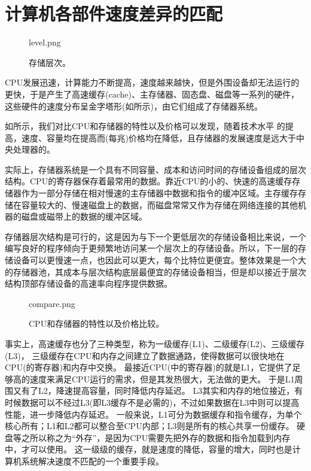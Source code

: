 \documentclass[final]{cvpr}
\begin{document}
\section{计算机各部件速度差异的匹配}\label{sec:Difference}

\begin{figure}
  	\begin{overpic}[width=\columnwidth]{level.png}\end{overpic}
    \caption{存储层次。}\label{fig:level}
\end{figure}


CPU发展迅速，计算能力不断提高，速度越来越快，但是外围设备却无法运行的更快，于是产生了高速缓存(cache)、主存储器、固态盘、磁盘等一系列的硬件，这些硬件的速度分布呈金字塔形(如所示)，由它们组成了存储器系统。

如所示，我们对比CPU和存储器的特性以及价格可以发现，随着技术水平 的提高，速度、容量均在提高而(每兆)价格均在降低，且存储器的发展速度是远大于中央处理器的。

实际上，存储器系统是一个具有不同容量、成本和访问时间的存储设备组成的层次结构。CPU的寄存器保存着最常用的数据。靠近CPU的小的、快速的高速缓存存储器作为一部分存储在相对慢速的主存储器中数据和指令的缓冲区域。主存缓存存储在容量较大的、慢速磁盘上的数据，而磁盘常常又作为存储在网络连接的其他机器的磁盘或磁带上的数据的缓冲区域。\cite{CSAPP}

存储器层次结构是可行的，这是因为与下一个更低层次的存储设备相比来说，一个编写良好的程序倾向于更频繁地访问某一个层次上的存储设备。所以，下一层的存储设备可以更慢速一点，也因此可以更大，每个比特位更便宜。整体效果是一个大的存储器池，其成本与层次结构底层最便宜的存储设备相当，但是却以接近于层次结构顶部存储设备的高速率向程序提供数据。\cite{CSAPP}


\begin{figure}
  	\begin{overpic}[width=\columnwidth]{compare.png}\end{overpic}
    \caption{CPU和存储器的特性以及价格比较。}\label{fig:cmp}
\end{figure}

事实上，高速缓存也分了三种类型，称为一级缓存(L1)、二级缓存(L2)、三级缓存(L3)，
三级缓存在CPU和内存之间建立了数据通路，使得数据可以很快地在CPU(的寄存器)和内存中交换。
最接近CPU(中的寄存器)的就是L1，它提供了足够高的速度来满足CPU运行的需求，但是其发热很大，无法做的更大。
于是L1周围又有了L2，降速提高容量，同时降低内存延迟。
L3其实和内存的地位接近，有时候数据可以不经过L3(即L3缓存不是必需的)，不过如果数据在L3中则可以提高性能，进一步降低内存延迟。
一般来说，L1可分为数据缓存和指令缓存，为单个核心所有；L1和L2都可以整合至CPU内部；L3则是所有的核心共享一份缓存。
硬盘等之所以称之为“外存”，是因为CPU需要先把外存的数据和指令加载到内存中，才可以使用。
这一级级的缓存，就是速度的降低，容量的增大，同时也是计算机系统解决速度不匹配的一个重要手段。
\end{document}
